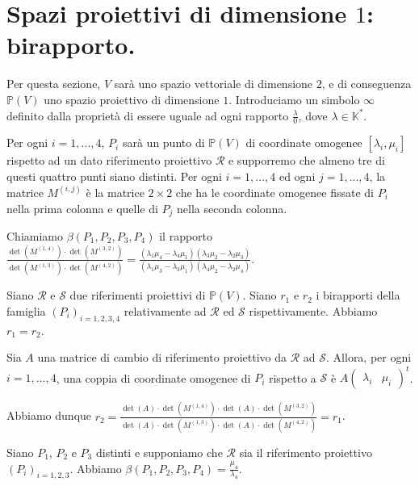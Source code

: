 \section{Spazi proiettivi di dimensione $1$: birapporto.}

	\par Per questa sezione, $V$ sar\`a uno spazio vettoriale di dimensione $2$, e di conseguenza $\mathbb{P}(V)$ uno spazio proiettivo di dimensione $1$. Introduciamo un simbolo $\infty$ definito dalla propriet\`a di essere uguale ad ogni rapporto $\frac{\lambda}{0}$, dove $\lambda \in \mathbb{K}^*$.
	\par Per ogni $i = 1, ..., 4$, $P_i$ sar\`a un punto di $\mathbb{P}(V)$ di coordinate omogenee $[\lambda_i, \mu_i]$ rispetto ad un dato riferimento proiettivo $\mathcal{R}$ e supporremo che almeno tre di questi quattro punti siano distinti. Per ogni $i = 1, ..., 4$ ed ogni $j = 1, ..., 4$, la matrice $M^{(i,j)}$ \`e la matrice $2 \times 2$ che ha le coordinate omogenee fissate di $P_i$ nella prima colonna e quelle di $P_j$ nella seconda colonna.
\begin{Definition}\label{def38}
	Chiamiamo  $\beta(P_1, P_2, P_3, P_4)$ il rapporto $\frac{\det(M^{(1,4)}) \cdot \det(M^{(3,2)})}{\det(M^{(1,3)}) \cdot \det(M^{(4,2)})} = \frac{(\lambda_1\mu_4 - \lambda_4\mu_1)(\lambda_3\mu_2 - \lambda_2\mu_3)}{(\lambda_1\mu_3 - \lambda_3\mu_1)(\lambda_4\mu_2 - \lambda_2\mu_4)}$.
\end{Definition}
\begin{Theorem}\label{th41}
	Siano $\mathcal{R}$ e $\mathcal{S}$ due riferimenti proiettivi di $\mathbb{P}(V)$. Siano $r_1$ e $r_2$ i birapporti della famiglia $(P_i)_{i = 1,2,3,4}$ relativamente ad $\mathcal{R}$ ed $\mathcal{S}$ rispettivamente. Abbiamo $r_1 = r_2$.
\end{Theorem}
\Proof Sia $A$ una matrice di cambio di riferimento proiettivo da $\mathcal{R}$ ad $\mathcal{S}$. Allora, per ogni $i = 1, ..., 4$, una coppia di coordinate omogenee di $P_i$ rispetto a $\mathcal{S}$ \`e $A \begin{pmatrix} \lambda_i & \mu_i \end{pmatrix}^t$.
	\par Abbiamo dunque $r_2 = \frac{\det(A) \cdot \det(M^{(1,4)}) \cdot \det(A) \cdot \det(M^{(3,2)})}{\det(A) \cdot \det(M^{(1,3)}) \cdot \det(A) \cdot \det(M^{(4,2)})} = r_1$. \EndProof
\begin{Theorem}\label{th42}
	Siano $P_1$, $P_2$ e $P_3$ distinti e supponiamo che $\mathcal{R}$ sia il riferimento proiettivo $(P_i)_{i = 1, 2, 3}$. Abbiamo $\beta(P_1, P_2, P_3, P_4) = \frac{\mu_4}{\lambda_4}$.
\end{Theorem}
